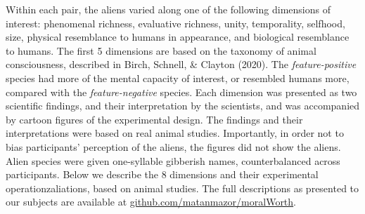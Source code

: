 \documentclass[10pt, letterpaper]{article}
\begin{document}
Within each pair, the aliens varied along one of the following
dimensions of interest: phenomenal richness, evaluative richness, unity,
temporality, selfhood, size, physical resemblance to humans in
appearance, and biological resemblance to humans. The first 5 dimensions
are based on the taxonomy of animal consciousness, described in Birch,
Schnell, \& Clayton (2020). The \emph{feature-positive} species had more
of the mental capacity of interest, or resembled humans more, compared
with the \emph{feature-negative} species. Each dimension was presented
as two scientific findings, and their interpretation by the scientists,
and was accompanied by cartoon figures of the experimental design. The
findings and their interpretations were based on real animal studies.
Importantly, in order not to bias participants' perception of the
aliens, the figures did not show the aliens. Alien species were given
one-syllable gibberish names, counterbalanced across participants. Below
we describe the 8 dimensions and their experimental operationzaliations,
based on animal studies. The full descriptions as presented to our
subjects are available at \url{github.com/matanmazor/moralWorth}.
\end{document}
